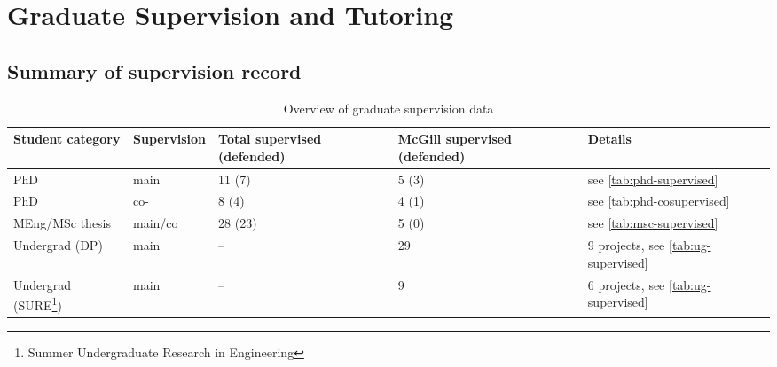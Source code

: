 \newpage 
\section{Graduate Supervision and Tutoring}

\subsection{Summary of supervision record}


\begin{table}[htb]
\footnotesize
\begin{tabular}{@{}p{3.5cm}lp{2.5cm}p{2.7cm}p{3.5cm}@{}}
\toprule
\textbf{Student category} & \textbf{Supervision} & \textbf{Total supervised (defended)} & \textbf{McGill supervised (defended)} & \textbf{Details} \\
\midrule
PhD & main & 11 (7) & 5 (3) & see \autoref{tab:phd-supervised}  \\
PhD & co- & 8 (4) & 4 (1) & see \autoref{tab:phd-cosupervised} \\
MEng/MSc thesis & main/co & 28 (23) & 5 (0) & see \autoref{tab:msc-supervised} \\
Undergrad (DP) & main & -- & 29 & 9 projects, see \autoref{tab:ug-supervised} \\ %
Undergrad (SURE\footnote{Summer Undergraduate Research in Engineering})  & main & -- & 9 & 6 projects, see \autoref{tab:ug-supervised} \\
\bottomrule
\end{tabular}
\caption{Overview of graduate supervision data}
\label{tab:graduate-supervisor-overview}
\end{table}



